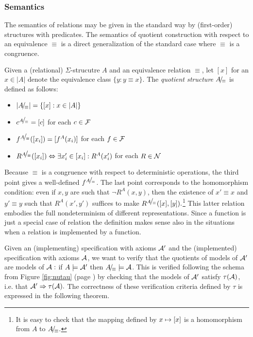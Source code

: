 \subsubsection{Semantics}
The semantics of relations may be given in the standard way by (first-order) structures with predicates. The semantics of quotient construction with respect
to
an equivalence $\equiv$ is a direct generalization of the standard case where $\equiv$ is a congruence.
\begin{DEFINITION}\label{de:relquot}
Given a (relational) $\Sigma$-strucutre $A$ and an equivalence relation $\equiv$, let
$[x]$ for an $x\in |A|$ denote the equivalence class $\{y:y\equiv x\}.$ The {\em quotient structure} $A\!{\textstyle /}\!_\equiv$ is defined as follows: \begin{itemize}\MyLPar
\item $|A\!{\textstyle /}\!_\equiv| = \{[x]:x\in |A|\}$ \item $c^{A\!{\textstyle /}\!_\equiv} = [c]$ for each $c\in{\cal F}$ \item $f^{A\!{\textstyle /}\!_\equiv}([x_i]) = [f^A(x_i)]$ for each $f\in{\cal F}$ \item $R^{A\!{\textstyle /}\!_\equiv}([x_i])\mathrel{\Leftrightarrow} \exists x'_i\in [x_i]: R^A(x'_i)$ for each
$R\in \cal N$
\end{itemize}
\end{DEFINITION}
\noindent Because $\equiv$ is a congruence with respect to deterministic operations, the
third point gives a well-defined $f^{A\!{\textstyle /}\!_\equiv}$. The last point corresponds
to the homomorphism condition: even if $x,y$ are such that $\neg R^A(x,y)$, then
the existence of $x'\equiv x$ and $y'\equiv y$ such that $R^A(x',y')$ suffices
to make $R^{A\!{\textstyle /}\!_\equiv}([x],[y]).$\footnote{It is easy to check that the mapping defined by $x\mathrel{\mapsto} [x]$ is a homomorphism from $A$ to $A\!{\textstyle /}\!_\equiv.$}
This latter relation embodies the full
nondeterminism of different representations. Since a function is just a special
case of relation the definition makes sense also in the situations when a relation is implemented by a function.

Given an (implementing) specification with axioms ${\cal A}'$ and the (implemented)
specification with axioms ${\cal A}$, we want to verify that the quotients of models of ${\cal A}'$ are models of ${\cal A} :$ if $A\models {\cal A}'$ then $A\!{\textstyle /}\!_\equiv\models {\cal A}$. This is verified following the schema from Figure \ref{fig:nutau} (page \pageref{'nutau'}) by checking that the models of
${\cal A}'$ satisfy $\tau({\cal A})$, i.e. that ${\cal A}'\mathrel\Rightarrow\tau({\cal A}).$ The correctness of these verification criteria defined by $\tau$ is expressed in the following theorem. 

